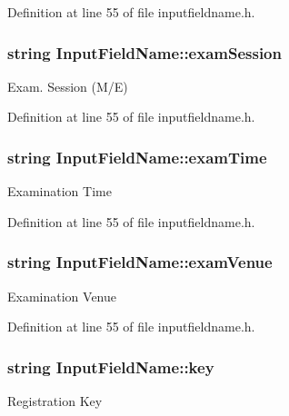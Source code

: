 Definition at line 55 of file inputfieldname.\-h.

\hypertarget{classInputFieldName_afef45e787d3c737f9bdc3126ce29d8b9}{
\subsubsection[{exam\-Session}]{\setlength{\rightskip}{0pt plus 5cm}string Input\-Field\-Name\-::exam\-Session}}\label{classInputFieldName_afef45e787d3c737f9bdc3126ce29d8b9}
Exam. Session (M/\-E) 

Definition at line 55 of file inputfieldname.\-h.

\hypertarget{classInputFieldName_ab667062be019e5912683d33c45885bd3}{
\subsubsection[{exam\-Time}]{\setlength{\rightskip}{0pt plus 5cm}string Input\-Field\-Name\-::exam\-Time}}\label{classInputFieldName_ab667062be019e5912683d33c45885bd3}
Examination Time 

Definition at line 55 of file inputfieldname.\-h.

\hypertarget{classInputFieldName_affaa2fe8246959748f43ea58f161b2b5}{
\subsubsection[{exam\-Venue}]{\setlength{\rightskip}{0pt plus 5cm}string Input\-Field\-Name\-::exam\-Venue}}\label{classInputFieldName_affaa2fe8246959748f43ea58f161b2b5}
Examination Venue 

Definition at line 55 of file inputfieldname.\-h.

\hypertarget{classInputFieldName_a26cffcb455cb1b977aa60b68c5b48fe4}{
\subsubsection[{key}]{\setlength{\rightskip}{0pt plus 5cm}string Input\-Field\-Name\-::key}}\label{classInputFieldName_a26cffcb455cb1b977aa60b68c5b48fe4}
Registration Key 

